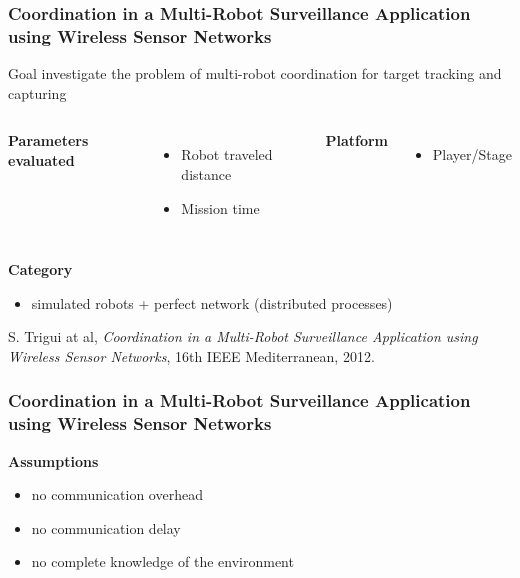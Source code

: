 \begin{frame}
	\frametitle{Coordination in a Multi-Robot Surveillance Application using Wireless Sensor Networks}
	
	\normalsize
	
	\vspace{0.3cm}
	
	\begin{block}{Goal}
		investigate the problem of multi-robot coordination for target tracking and capturing
	\end{block}
	
	\vspace{0.15cm}
	
	\begin{columns}[T]
		
		\textbf{Parameters evaluated}
		
		\begin{itemize}
			\item Robot traveled distance
			
			\item Mission time
		\end{itemize}
		
		
		\textbf{Platform}
		
		\begin{itemize}
			\item Player/Stage
		\end{itemize}
	\end{columns}
	
	\vspace{0.5cm}
	
	\textbf{Category}
	
	\begin{itemize}
		\item simulated robots + perfect network (distributed processes)
	\end{itemize}
	
	\tiny
	S. Trigui at al, \emph{Coordination in a Multi-Robot Surveillance Application using Wireless Sensor Networks},
	\vspace{-0.35cm}
	16th IEEE Mediterranean, 2012.
\end{frame}

\begin{frame}
	\frametitle{Coordination in a Multi-Robot Surveillance Application using Wireless Sensor Networks}
	
	\textbf{Assumptions}
	
	\begin{itemize}
		\item no communication overhead
		
		\item no communication delay
		
		\item no complete knowledge of the environment
	\end{itemize}
\end{frame}

